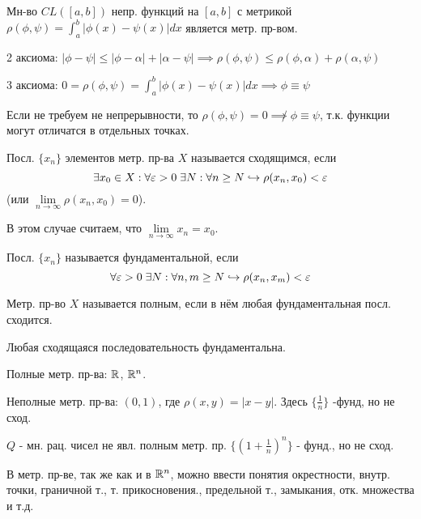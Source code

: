 \documentclass{article}
\begin{document}
\begin{eg}
  Мн-во $CL([a,b])$ непр. функций на $[a,b]$ с метрикой
  $\rho(\phi, \psi)=\int_{a}^{b}|\phi(x)-\psi(x)|dx$
  является метр. пр-вом.

  2 аксиома: $|\phi-\psi|\le |\phi-\alpha|+|\alpha-\psi|\implies \rho(\phi,\psi)\le \rho(\phi,\alpha)+\rho(\alpha,\psi)$

  3 аксиома: $0=\rho(\phi,\psi)=\int_{a}^{b}|\phi(x)-\psi(x)|dx \implies \phi \equiv \psi$

  Если не требуем не непрерывности, то $\rho(\phi,\psi)=0 \not \implies \phi \equiv \psi$,
  т.к. функции могут отличатся в отдельных точках.
\end{eg}
\begin{definition}
  Посл. $\{x_{n}\}$ элементов метр. пр-ва $X$ называется сходящимся, если
  \[
    \exists x_0\in X: \forall \varepsilon>0  \;\exists N: \forall n\ge N \hookrightarrow \rho(x_n,x_0)<\varepsilon
  \]
  (или $\lim \limits_{n\to\infty} \rho(x_n,x_0)=0$).

  В этом случае считаем, что $\lim \limits_{n\to\infty}x_n=x_0$.
\end{definition}
\begin{definition}
  Посл. $\{x_n\}$ называется фундаментальной, если
  \[
    \forall \varepsilon>0 \; \exists N:\forall n,m \ge N\hookrightarrow \rho(x_n,x_m) < \varepsilon
  \]
\end{definition}
\begin{definition}
  Метр. пр-во $X$ называется полным, если в нём любая фундаментальная посл. сходится.
\end{definition}
\begin{theorem}
  Любая сходящаяся последовательность фундаментальна.
\end{theorem}
\begin{eg}
  Полные метр. пр-ва: $\mathbb{R}$, $\mathbb{R}^{n}$.
\end{eg}
\begin{eg}
  Неполные метр. пр-ва: $(0,1)$, где $\rho(x,y)=|x-y|$. 
  Здесь $\{\frac{1}{n}\}$ -фунд, но не сход.
\end{eg}
\begin{eg}
  $Q$ - мн. рац. чисел не явл. полным метр. пр.
  $\{(1+\frac{1}{n})^{n}\}$ - фунд., но не сход.
\end{eg}
\begin{remark}
  В метр. пр-ве, так же как и в $\mathbb{R}^{n}$, можно ввести понятия окрестности,
  внутр. точки, граничной т., т. прикосновения., предельной т.,
  замыкания, отк. множества и т.д.
\end{remark}
\end{document}
